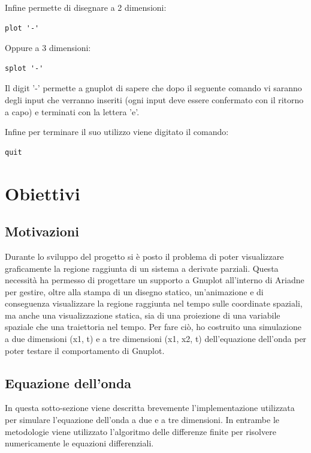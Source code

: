 \documentclass{article}
\begin{document}
Infine permette di disegnare a 2 dimensioni:
\begin{verbatim}
plot '-' 
\end{verbatim}

Oppure a 3 dimensioni:
\begin{verbatim}
splot '-'
\end{verbatim}

Il digit '-' permette a gnuplot di sapere che dopo il seguente comando vi saranno degli input che verranno inseriti (ogni input deve essere confermato con il ritorno a capo) e terminati con la lettera 'e'.
\newline

Infine per terminare il suo utilizzo viene digitato il comando:
\begin{verbatim}
quit
\end{verbatim}

\section{Obiettivi}


\subsection{Motivazioni}

Durante lo sviluppo del progetto si è posto il problema di poter visualizzare graficamente la regione raggiunta di un sistema a derivate parziali. Questa necessità ha permesso di progettare un supporto a Gnuplot all'interno di Ariadne per gestire, oltre alla stampa di un disegno statico, un'animazione e di conseguenza visualizzare la regione raggiunta nel tempo sulle coordinate spaziali, ma anche una visualizzazione statica, sia di una proiezione di una variabile spaziale che una traiettoria nel tempo.
Per fare ciò, ho costruito una simulazione a due dimensioni (x1, t) e a tre dimensioni (x1, x2, t) dell'equazione dell'onda per poter testare il comportamento di Gnuplot.

\subsection{Equazione dell'onda}
In questa sotto-sezione viene descritta brevemente l'implementazione utilizzata per simulare l'equazione dell'onda a due e a tre dimensioni. In entrambe le metodologie viene utilizzato l'algoritmo delle differenze finite per risolvere numericamente le equazioni differenziali.
\end{document}
